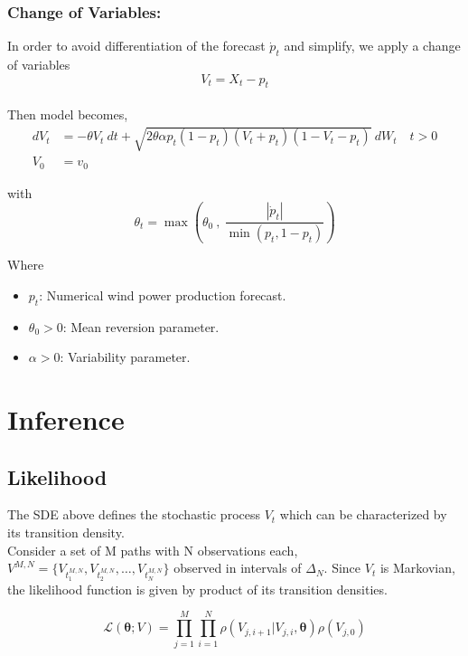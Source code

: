 \documentclass[ima, 20pt, portrait, plainboxedsections]{sciposter}
\begin{document}
\begin{multicols}{3}
\subsubsection*{Change of Variables:}
In order to avoid differentiation of the forecast $\dot{p}_t$ and simplify, we apply a change of variables $$V_t = X_t - p_t$$  \\
Then  model becomes,
\begin{equation}
\begin{split}
dV_t &=  - \theta V_t \  dt + \sqrt{2 \theta \alpha p_t(1-p_t) (V_t +p_t ) (1-V_t-p_t)} \  dW_t \quad t > 0 \\
V_0 & = v_0
\end{split}\label{main}
\end{equation}


with
\begin{equation}
\theta_t = \max \left( \theta_0 \ , \ \frac{|\dot{p}_t|}{\min (p_t, 1-p_t)}  \right )
\end{equation}

Where 
\begin{itemize}
\item $p_t$: Numerical wind power production forecast.
\item $\theta_0 >0$: Mean reversion parameter.
\item $\alpha>0$: Variability parameter.
\end{itemize}


\section*{Inference}

\subsection*{Likelihood}
The SDE above defines the stochastic process $V_t$ which can be characterized by its transition density. \\

Consider a set of M paths with N observations each, $ V^{M,N}=\{ V_{t_1^{M,N}} , V_{t_2^{M,N}} ,\ldots , V_{t_N^{M,N}} \}$ observed in intervals of $\Delta_N$. Since $V_t$ is Markovian, the likelihood function is given by  product of its  transition densities.

\begin{equation}
\mathcal{L}(\bm{\theta};V) =\prod\limits_{j=1}^M \prod\limits_{i=1}^N \rho ( {V_{j,i+1}|V_{j,i}}, \bm{\theta})  \rho (V_{j,0}) 
\label{likelihood}
\end{equation}


\end{multicols}
\end{document}
